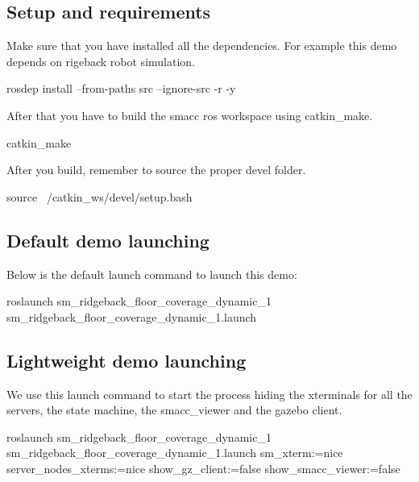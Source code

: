 \subsection*{Setup and requirements}

Make sure that you have installed all the dependencies. For example this demo depends on rigeback robot simulation.


\begin{DoxyCode}
rosdep install --from-paths src --ignore-src -r -y 
\end{DoxyCode}


After that you have to build the smacc ros workspace using catkin\+\_\+make.


\begin{DoxyCode}
catkin\_make
\end{DoxyCode}


After you build, remember to source the proper devel folder.


\begin{DoxyCode}
source ~/catkin\_ws/devel/setup.bash
\end{DoxyCode}


\subsection*{Default demo launching}

Below is the default launch command to launch this demo\+:


\begin{DoxyCode}
roslaunch sm\_ridgeback\_floor\_coverage\_dynamic\_1 sm\_ridgeback\_floor\_coverage\_dynamic\_1.launch
\end{DoxyCode}


\subsection*{Lightweight demo launching}

We use this launch command to start the process hiding the xterminals for all the servers, the state machine, the smacc\+\_\+viewer and the gazebo client.


\begin{DoxyCode}
roslaunch sm\_ridgeback\_floor\_coverage\_dynamic\_1 sm\_ridgeback\_floor\_coverage\_dynamic\_1.launch sm\_xterm:=nice
       server\_nodes\_xterms:=nice show\_gz\_client:=false show\_smacc\_viewer:=false
\end{DoxyCode}
 